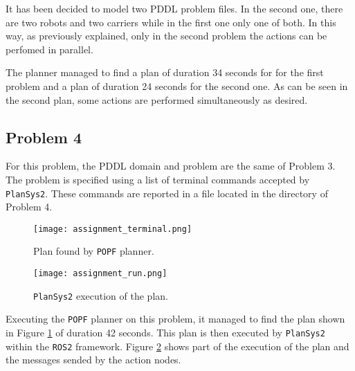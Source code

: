 It has been decided to model two PDDL problem files.
In the second one, there are two robots and two carriers while in the first one only one of both.
In this way, as previously explained, only in the second problem the actions can be perfomed in parallel.

The planner managed to find a plan of duration 34 seconds for for the first problem and a plan of
duration 24 seconds for the second one.
As can be seen in the second plan, some actions are performed simultaneously as desired.

\subsection{Problem 4}
For this problem, the PDDL domain and problem are the same of Problem 3.
The problem is specified using a list of terminal commands accepted by \texttt{PlanSys2}.
These commands are reported in a file located in the directory of Problem 4.


\begin{figure}[t]
\centerline{\texttt{[image: assignment\_terminal.png]}}
\caption{Plan found by \texttt{POPF} planner.}
\label{fig:plan}
\end{figure}
    
\begin{figure}[t]
\centerline{\texttt{[image: assignment\_run.png]}}
\caption{\texttt{PlanSys2} execution of the plan.}
\label{fig:execution}
\end{figure}

Executing the \texttt{POPF} planner on this problem, it managed to find the plan shown in Figure 
\ref{fig:plan} of duration 42 seconds.
This plan is then executed by \texttt{PlanSys2} within the \texttt{ROS2} framework. 
Figure \ref{fig:execution} shows part of the execution of the plan and the messages sended by the action nodes.
